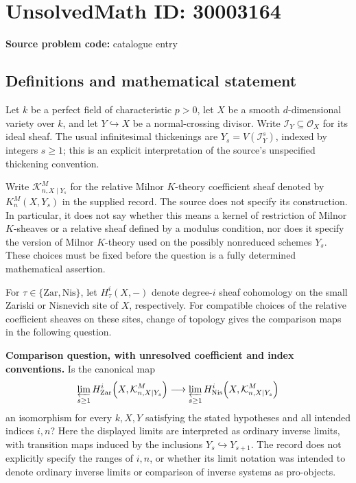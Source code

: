\documentclass[11pt]{article}
\begin{document}
\section*{UnsolvedMath ID: 30003164}
\textbf{Source problem code:} catalogue entry
\subsection{Definitions and mathematical statement}
Let \(k\) be a perfect field of characteristic \(p>0\), let \(X\) be a smooth \(d\)-dimensional variety over \(k\), and let \(Y\hookrightarrow X\) be a normal-crossing divisor. Write \(\mathcal I_Y\subseteq\mathcal O_X\) for its ideal sheaf. The usual infinitesimal thickenings are \(Y_s=V(\mathcal I_Y^s)\), indexed by integers \(s\geq1\); this is an explicit interpretation of the source's unspecified thickening convention.

Write \(\mathcal K^M_{n,X\mid Y_s}\) for the relative Milnor \(K\)-theory coefficient sheaf denoted by \(K_n^M(X,Y_s)\) in the supplied record. The source does not specify its construction. In particular, it does not say whether this means a kernel of restriction of Milnor \(K\)-sheaves or a relative sheaf defined by a modulus condition, nor does it specify the version of Milnor \(K\)-theory used on the possibly nonreduced schemes \(Y_s\). These choices must be fixed before the question is a fully determined mathematical assertion.

For \(\tau\in\{\mathrm{Zar},\mathrm{Nis}\}\), let \(H^i_\tau(X,-)\) denote degree-\(i\) sheaf cohomology on the small Zariski or Nisnevich site of \(X\), respectively. For compatible choices of the relative coefficient sheaves on these sites, change of topology gives the comparison maps in the following question.

\textbf{Comparison question, with unresolved coefficient and index conventions.} Is the canonical map
\[
\varprojlim_{s\geq1} H^i_{\mathrm{Zar}}\!\left(X,\mathcal K^M_{n,X\mid Y_s}\right)
\longrightarrow
\varprojlim_{s\geq1} H^i_{\mathrm{Nis}}\!\left(X,\mathcal K^M_{n,X\mid Y_s}\right)
\]
an isomorphism for every \(k,X,Y\) satisfying the stated hypotheses and all intended indices \(i,n\)? Here the displayed limits are interpreted as ordinary inverse limits, with transition maps induced by the inclusions \(Y_s\hookrightarrow Y_{s+1}\). The record does not explicitly specify the ranges of \(i,n\), or whether its limit notation was intended to denote ordinary inverse limits or comparison of inverse systems as pro-objects.
\end{document}
